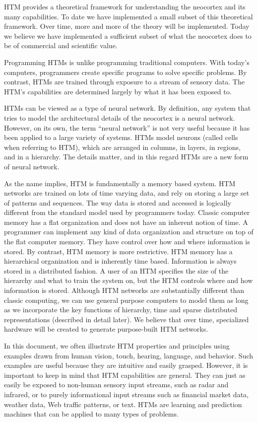 \documentclass{report}
\begin{document}
HTM provides a theoretical framework for understanding the neocortex
and its many capabilities. To date we have implemented a small subset
of this theoretical framework. Over time, more and more of the theory
will be implemented. Today we believe we have implemented a sufficient
subset of what the neocortex does to be of commercial and scientific
value.

Programming HTMs is unlike programming traditional computers. With
today's computers, programmers create specific programs to solve
specific problems. By contrast, HTMs are trained through exposure to a
stream of sensory data. The HTM's capabilities are determined largely
by what it has been exposed to.

HTMs can be viewed as a type of neural network. By definition, any
system that tries to model the architectural details of the neocortex
is a neural network. However, on its own, the term ``neural network'' is
not very useful because it has been applied to a large variety of
systems. HTMs model neurons (called cells when referring to HTM),
which are arranged in columns, in layers, in regions, and in a
hierarchy. The details matter, and in this regard HTMs are a new form
of neural network.

As the name implies, HTM is fundamentally a memory based system. HTM
networks are trained on lots of time varying data, and rely on storing
a large set of patterns and sequences. The way data is stored and
accessed is logically different from the standard model used by
programmers today. Classic computer memory has a flat organization and
does not have an inherent notion of time. A programmer can implement
any kind of data organization and structure on top of the flat
computer memory. They have control over how and where information is
stored. By contrast, HTM memory is more restrictive. HTM memory has a
hierarchical organization and is inherently time based. Information is
always stored in a distributed fashion. A user of an HTM specifies the
size of the hierarchy and what to train the system on, but the HTM
controls where and how information is stored. Although HTM networks
are substantially different than classic computing, we can use general
purpose computers to model them as long as we incorporate the key
functions of hierarchy, time and sparse distributed representations
(described in detail later). We believe that over time, specialized
hardware will be created to generate purpose-built HTM networks.

In this document, we often illustrate HTM properties and principles
using examples drawn from human vision, touch, hearing, language, and
behavior. Such examples are useful because they are intuitive and
easily grasped. However, it is important to keep in mind that HTM
capabilities are general. They can just as easily be exposed to
non-human sensory input streams, such as radar and infrared, or to
purely informational input streams such as financial market data,
weather data, Web traffic patterns, or text. HTMs are learning and
prediction machines that can be applied to many types of problems.
\end{document}
